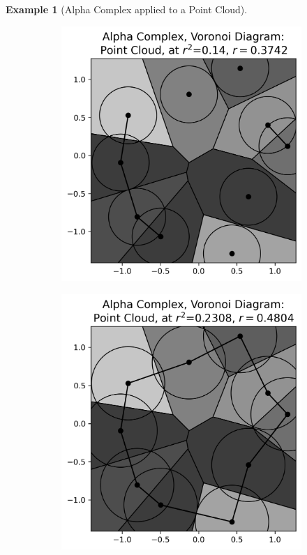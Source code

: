 \documentclass[ma]{uncgdissertationexp}
\theoremstyle{plain}
\theoremstyle{definition}
\newtheorem{example}[theorem]{Example}
\theoremstyle{remark}
\begin{document}
\begin{example}[Alpha Complex applied to a Point Cloud]
\begin{figure}[H]
\begin{subfigure}[b]{0.27\textwidth}
    \end{subfigure}
    \begin{subfigure}[b]{0.27\textwidth}
        \includegraphics[width=\textwidth]{point_cloud_plot_alpha_1.png}
    \end{subfigure}
    \begin{subfigure}[b]{0.27\textwidth}
        \includegraphics[width=\textwidth]{point_cloud_plot_alpha_2.png}

\end{subfigure}
\end{figure}
\end{example}
\end{document}
